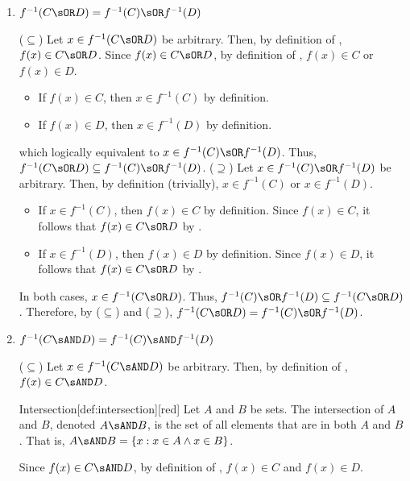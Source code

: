 \begin{enumerate}
\begin{enumerate}
    \newpage
    \item $f^{-1}(C \sOR D)=f^{-1}(C) \sOR f^{-1}(D)$
    \begin{subprove}
      ($\subseteq$) Let $x \in f^{-1}(C \sOR D)$ be arbitrary. Then, by definition of , 
      $f(x) \in C \sOR D$.
      Since $f(x) \in C \sOR D$, by definition of , $f(x) \in C$ or $f(x) \in D$.
      \begin{itemize}
        \item If $f(x) \in C$, then $x \in f^{-1}(C)$ by definition.
        \item If $f(x) \in D$, then $x \in f^{-1}(D)$ by definition.
      \end{itemize}
      which logically equivalent to $x \in f^{-1}(C) \sOR f^{-1}(D)$.
      Thus, $f^{-1}(C \sOR D) \subseteq f^{-1}(C) \sOR f^{-1}(D)$.\proofstep
      ($\supseteq$) Let $x \in f^{-1}(C) \sOR f^{-1}(D)$ be arbitrary. Then, by definition (trivially), 
      $x \in f^{-1}(C)$ or $x \in f^{-1}(D)$.
      \begin{itemize}
        \item If $x \in f^{-1}(C)$, then $f(x) \in C$ by definition.
        Since $f(x) \in C$, it follows that $f(x) \in C \sOR D$ by .
        \item If $x \in f^{-1}(D)$, then $f(x) \in D$ by definition.
        Since $f(x) \in D$, it follows that $f(x) \in C \sOR D$ by .
      \end{itemize}
      In both cases, $x \in f^{-1}(C \sOR D)$.
      Thus, $f^{-1}(C) \sOR f^{-1}(D) \subseteq f^{-1}(C \sOR D)$.\proofstep
      Therefore, by ($\subseteq$) and ($\supseteq$), $f^{-1}(C \sOR D)=f^{-1}(C) \sOR f^{-1}(D)$.
    \end{subprove}
    \item $f^{-1}(C \sAND D)=f^{-1}(C) \sAND f^{-1}(D)$
    \begin{subprove}
      ($\subseteq$) Let $x \in f^{-1}(C \sAND D)$ be arbitrary. Then, by definition of , 
      $f(x) \in C \sAND D$.
      \begin{define}{Intersection}[def:intersection][red]
        Let $A$ and $B$ be sets. The intersection of $A$ and $B$, denoted $A \sAND B$, is the set of all elements that are in both $A$ and $B$. That is, $A \sAND B = \{x : x \in A \land x \in B\}$.
      \end{define}
      Since $f(x) \in C \sAND D$, by definition of , $f(x) \in C$ and $f(x) \in D$.

\end{subprove}
\end{enumerate}
\end{enumerate}
